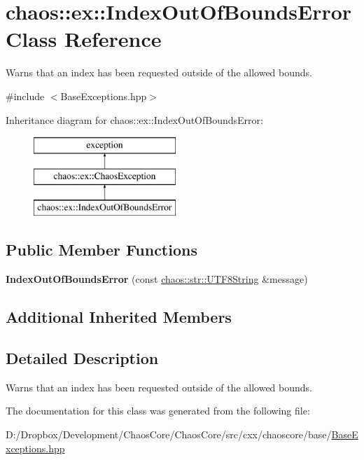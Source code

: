 \hypertarget{classchaos_1_1ex_1_1_index_out_of_bounds_error}{}\section{chaos\+:\+:ex\+:\+:Index\+Out\+Of\+Bounds\+Error Class Reference}
\label{classchaos_1_1ex_1_1_index_out_of_bounds_error}


Warns that an index has been requested outside of the allowed bounds.  




{\ttfamily \#include $<$Base\+Exceptions.\+hpp$>$}

Inheritance diagram for chaos\+:\+:ex\+:\+:Index\+Out\+Of\+Bounds\+Error\+:\begin{figure}[H]
\begin{center}
\leavevmode
\includegraphics[height=3.000000cm]{classchaos_1_1ex_1_1_index_out_of_bounds_error}
\end{center}
\end{figure}
\subsection*{Public Member Functions}
\begin{DoxyCompactItemize}
\item 
\hypertarget{classchaos_1_1ex_1_1_index_out_of_bounds_error_a605674cdcd80159feffdc66bf4ae36f5}{}{\bfseries Index\+Out\+Of\+Bounds\+Error} (const \hyperlink{classchaos_1_1str_1_1_u_t_f8_string}{chaos\+::str\+::\+U\+T\+F8\+String} \&message)\label{classchaos_1_1ex_1_1_index_out_of_bounds_error_a605674cdcd80159feffdc66bf4ae36f5}

\end{DoxyCompactItemize}
\subsection*{Additional Inherited Members}


\subsection{Detailed Description}
Warns that an index has been requested outside of the allowed bounds. 

The documentation for this class was generated from the following file\+:\begin{DoxyCompactItemize}
\item 
D\+:/\+Dropbox/\+Development/\+Chaos\+Core/\+Chaos\+Core/src/cxx/chaoscore/base/\hyperlink{_base_exceptions_8hpp}{Base\+Exceptions.\+hpp}\end{DoxyCompactItemize}
